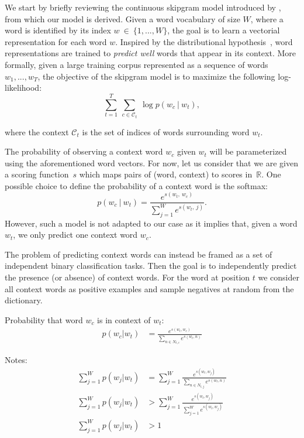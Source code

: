 We start by briefly reviewing the continuous skipgram model introduced by , from which our model is derived.
Given a word vocabulary of size $W$, where a word is identified by its index $w~\in~\{1, ..., W\}$, the goal is to learn a vectorial representation for each word $w$.
Inspired by the distributional hypothesis~\cite{harris1954distributional}, word representations are trained to \emph{predict well} words that appear in its context.
More formally, given a large training corpus represented as a sequence of words $w_1, ..., w_T$, the objective of the skipgram model is to maximize the following log-likelihood:
\begin{equation*}
  \sum_{t=1}^T \ \sum_{c \in \mathcal{C}_t} \ \log p(w_c \ | \ w_t),
\end{equation*}

where the context $\mathcal{C}_t$ is the set of indices of words surrounding word $w_t$.

The probability of observing a context word $w_c$ given $w_t$ will be parameterized using the aforementioned word vectors.
For now, let us consider that we are given a scoring function~$s$ which maps pairs of (word, context) to scores in~$\mathbb{R}$.
One possible choice to define the probability of a context word is the softmax:
\begin{equation*}
p(w_c \ | \ w_t) = \frac{e^{s(w_t,\ w_c)}}{\sum_{j=1}^W e^{s(w_t,\ j)}}.
\end{equation*}
However, such a model is not adapted to our case as it implies that, given a word $w_t$, we only predict one context word $w_c$.

The problem of predicting context words can instead be framed as a set of independent binary classification tasks.
Then the goal is to independently predict the presence (or absence) of context words.
For the word at position $t$ we consider all context words as positive examples and sample negatives at random from the dictionary.

Probability that word $w_c$ is in context of $w_t$:
\begin{align*}
	p(w_c | w_t) &= \frac{e^{s(w_t, w_c)}}{\sum_{n \in N_{t,c}} e^{s(w_t, n)}} 

\end{align*}

Notes:
\begin{align*}
  \sum_{j=1}^W p(w_j | w_t) &= \sum_{j=1}^W \frac{e^{s(w_t, w_j)}}{\sum_{n \in N_{t,j}} e^{s(w_t, n)}} \\
  \sum_{j=1}^W p(w_j | w_t) &> \sum_{j=1}^W \frac{e^{s(w_t, w_j)}}{\sum_{j=1}^W e^{s(w_t, w_j)}} \\
  \sum_{j=1}^W p(w_j | w_t) &> 1 
\end{align*}


